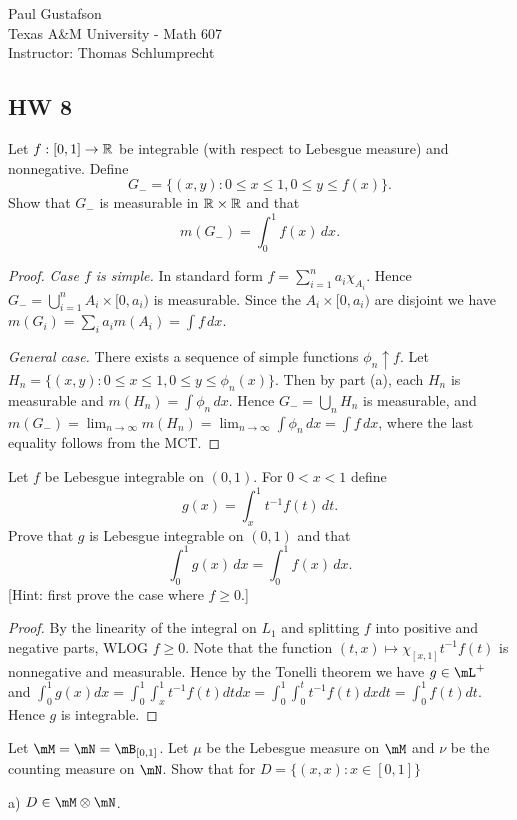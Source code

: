 \documentclass{article}
\begin{document}
\noindent Paul Gustafson\\
\noindent Texas A\&M University - Math 607\\ 
\noindent Instructor: Thomas Schlumprecht

\subsection*{HW 8}
 Let $f:[0,1] \to \mathbb{R}$ be integrable (with respect to Lebesgue measure) and nonnegative. Define 
$$G_{-} =  \{(x,y) : 0 \le x \le 1, 0 \le y \le f(x) \}.$$
Show that $G_-$ is measurable in $\mathbb{R} \times \mathbb{R}$ and that 
$$m(G_-) = \int_0^1 f(x) \, dx.$$
\begin{proof}
\emph{Case $f$ is simple.}  In standard form $f = \sum_{i=1}^n a_i \chi_{A_i}$.  Hence $G_- = \bigcup_{i=1}^n A_i \times [0, a_i)$ is measurable. Since the $A_i \times [0, a_i)$ are disjoint we have $m(G_i) = \sum_i a_i m(A_i) = \int f \, dx$.

\emph{General case.} There exists a sequence of simple functions $\phi_n \uparrow f$.   Let $H_n = \{(x,y) : 0 \le x \le 1, 0 \le y \le \phi_n(x) \}$.  Then by part (a), each $H_n$ is measurable and $m(H_n) = \int \phi_n \, dx$.  Hence $G_- = \bigcup_n H_n$ is measurable, and $m(G_-) = \lim_{n \to \infty} m(H_n) = \lim_{n \to \infty} \int \phi_n \, dx = \int f \, dx$, where the last equality follows from the MCT.
\end{proof}

 Let $f$ be Lebesgue integrable on $(0,1)$. For $0< x < 1$ define
$$g(x) = \int_x^1 t^{-1} f(t) \, dt.$$
Prove that $g$ is Lebesgue integrable on $(0,1)$ and that 
$$\int_0^1 g(x) \, dx = \int_0^1 f(x) \, dx.$$
[Hint: first prove the case where $f \ge 0$.]
\begin{proof}
By the linearity of the integral on $L_1$ and splitting $f$ into positive and negative parts, WLOG $f \ge 0$.  
Note that the function $(t,x) \mapsto \chi_{[x,1]} t^{-1} f(t)$ is nonnegative and measurable.  Hence by the Tonelli theorem we have $g \in \mL^+$ and
$\int_0^1 g(x) dx = \int_0^1 \int_x^1 t^{-1} f(t) dt dx = \int_0^1 \int_0^t t^{-1} f(t) dx dt = \int_0^1 f(t) dt$. Hence $g$ is integrable.
\end{proof}


 Let $\mM = \mN = \mB_{[0,1]}$. Let $\mu$ be the Lebesgue measure on $\mM$ and $\nu$ be the counting measure on $\mN$. Show that for $D = \{(x,x) : x \in [0,1]\}$

a) $D \in \mM \otimes \mN$.
\end{document}
